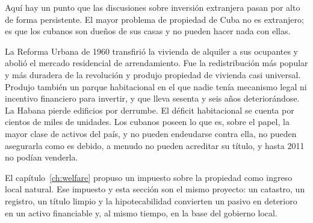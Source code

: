 Aquí hay un punto que las discusiones sobre inversión extranjera pasan por alto de forma
persistente. El mayor problema de propiedad de Cuba no es extranjero; es que los cubanos son
dueños de sus casas y no pueden hacer nada con ellas.

La Reforma Urbana de 1960 transfirió la vivienda de alquiler a sus ocupantes y abolió el mercado
residencial de arrendamiento. Fue la redistribución más popular y más duradera de la revolución
y produjo propiedad de vivienda casi universal. Produjo también un parque habitacional en el que
nadie tenía mecanismo legal ni incentivo financiero para invertir, y que lleva sesenta y seis
años deteriorándose. La Habana pierde edificios por derrumbe. El déficit habitacional se cuenta
por cientos de miles de unidades.\unv{} Los cubanos poseen lo que es, sobre el papel, la mayor
clase de activos del país, y no pueden endeudarse contra ella, no pueden asegurarla como es
debido, a menudo no pueden acreditar su título, y hasta 2011 no podían venderla.

El capítulo~\ref{ch:welfare} propuso un impuesto sobre la propiedad como ingreso local natural.
Ese impuesto y esta sección son el mismo proyecto: un catastro, un registro, un título limpio y
la hipotecabilidad convierten un pasivo en deterioro en un activo financiable y, al mismo
tiempo, en la base del gobierno local.

